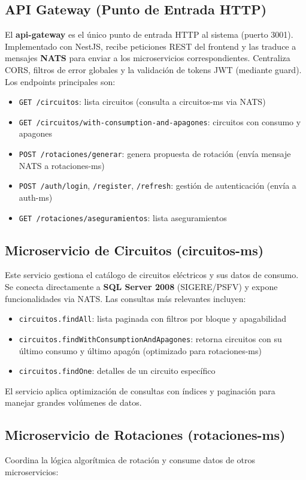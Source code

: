 \subsection{API Gateway (Punto de Entrada HTTP)}
El \textbf{api-gateway} es el único punto de entrada HTTP al sistema (puerto 3001). Implementado con NestJS, recibe peticiones REST del frontend y las traduce a mensajes \textbf{NATS} para enviar a los microservicios correspondientes. Centraliza CORS, filtros de error globales y la validación de tokens JWT (mediante guard). Los endpoints principales son:
\begin{itemize}
    \item \texttt{GET /circuitos}: lista circuitos (consulta a circuitos-ms via NATS)
    \item \texttt{GET /circuitos/with-consumption-and-apagones}: circuitos con consumo y apagones
    \item \texttt{POST /rotaciones/generar}: genera propuesta de rotación (envía mensaje NATS a rotaciones-ms)
    \item \texttt{POST /auth/login}, \texttt{/register}, \texttt{/refresh}: gestión de autenticación (envía a auth-ms)
    \item \texttt{GET /rotaciones/aseguramientos}: lista aseguramientos
\end{itemize}

\subsection{Microservicio de Circuitos (circuitos-ms)}
Este servicio gestiona el catálogo de circuitos eléctricos y sus datos de consumo. Se conecta directamente a \textbf{SQL Server 2008} (SIGERE/PSFV) y expone funcionalidades via NATS. Las consultas más relevantes incluyen:
\begin{itemize}
    \item \texttt{circuitos.findAll}: lista paginada con filtros por bloque y apagabilidad
    \item \texttt{circuitos.findWithConsumptionAndApagones}: retorna circuitos con su último consumo y último apagón (optimizado para rotaciones-ms)
    \item \texttt{circuitos.findOne}: detalles de un circuito específico
\end{itemize}
El servicio aplica optimización de consultas con índices y paginación para manejar grandes volúmenes de datos.

\subsection{Microservicio de Rotaciones (rotaciones-ms)}
Coordina la lógica algorítmica de rotación y consume datos de otros microservicios:

